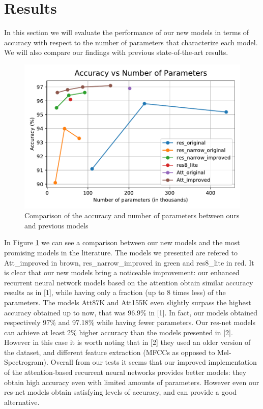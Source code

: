 
\section{Results}
\label{sec:results}

In this section we will evaluate the performance of our new models in terms of accuracy with respect to the number of parameters that characterize each model. We will also compare our findings with previous state-of-the-art results.

\begin{figure}[htbp]
\centerline{\includegraphics[scale=.6]{acc_vs_par.pdf}}
\caption{Comparison of the accuracy and number of parameters between ours and previous models}
\label{avp}
\end{figure}

In Figure \ref{avp} we can see a comparison between our new models and the most promising models in the literature. The models we presented are refered to Att_improved in brown, res_narrow_improved in green and res8_lite in red.
It is clear that our new models bring a noticeable improvement: our enhanced recurrent neural network models based on the attention obtain similar accuracy results as in [1], while having only a fraction (up to 8 times less) of the parameters. The models Att87K and Att155K even slightly surpass the highest accuracy obtained up to now, that was 96.9\% in [1]. In fact, our models obtained respectively 97\% and 97.18\% while having fewer parameters. 
Our res-net models can achieve at least 2\% higher accuracy than the models presented in [2]. However in this case it is worth noting that in [2] they used an older version of the dataset, and different feature extraction (MFCCs as opposed to Mel-Spectrogram). Overall from our tests it seems that our improved implementation of the attention-based recurrent neural networks provides better models: they obtain high accuracy even with limited amounts of parameters. However even our res-net models obtain satisfying levels of accuracy, and can provide a good alternative.

